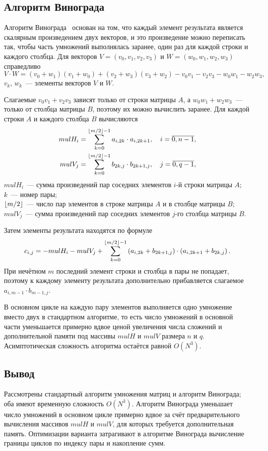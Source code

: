\subsection{Алгоритм Винограда}
Алгоритм Винограда~\cite{winograd1968} основан на том, что каждый элемент результата является скалярным произведением двух векторов, и это произведение можно переписать так, чтобы часть умножений выполнялась заранее, один раз для каждой строки и каждого столбца. Для векторов $V = (v_0, v_1, v_2, v_3)$ и $W = (w_0, w_1, w_2, w_3)$ справедливо
\begin{equation}
	\label{eq:wino-idea}
	V \cdot W = (v_0 + w_1)(v_1 + w_0) + (v_2 + w_3)(v_3 + w_2) - v_0 v_1 - v_2 v_3 - w_0 w_1 - w_2 w_3,
\end{equation}
\where{} $v_k$, $w_k$~--- элементы векторов $V$ и $W$.

Слагаемые $v_0 v_1 + v_2 v_3$ зависят только от строки матрицы $A$, а $w_0 w_1 + w_2 w_3$~--- только от столбца матрицы $B$, поэтому их можно вычислить заранее. Для каждой строки $A$ и каждого столбца $B$ вычисляются
\begin{align}
	\label{eq:mulH}
	mulH_i &= \sum_{k=0}^{\lfloor m/2 \rfloor-1} a_{i,2k} \cdot a_{i,2k+1}, \quad i = \overline{0, n-1}, \\
	\label{eq:mulV}
	mulV_j &= \sum_{k=0}^{\lfloor m/2 \rfloor-1} b_{2k,j} \cdot b_{2k+1,j}, \quad j = \overline{0, q-1},
\end{align}
\where{} $mulH_i$~--- сумма произведений пар соседних элементов $i$-й строки матрицы $A$;\\
$k$~--- номер пары;\\
$\lfloor m/2 \rfloor$~--- число пар элементов в строке матрицы $A$ и в столбце матрицы $B$;\\
$mulV_j$~--- сумма произведений пар соседних элементов $j$-го столбца матрицы $B$.

Затем элементы результата находятся по формуле
\begin{equation}
	\label{eq:wino-c}
	c_{i,j} = -mulH_i - mulV_j + \sum_{k=0}^{\lfloor m/2 \rfloor-1} \left(a_{i,2k} + b_{2k+1,j}\right) \cdot \left(a_{i,2k+1} + b_{2k,j}\right).
\end{equation}
При нечётном $m$ последний элемент строки и столбца в пары не попадает, поэтому к каждому элементу результата дополнительно прибавляется слагаемое $a_{i,m-1} \cdot b_{m-1,j}$.

В основном цикле на каждую пару элементов выполняется одно умножение вместо двух в стандартном алгоритме, то есть число умножений в основной части уменьшается примерно вдвое ценой увеличения числа сложений и дополнительной памяти под массивы $mulH$ и $mulV$ размера $n$ и $q$. Асимптотическая сложность алгоритма остаётся равной $O(N^3)$.

\subsection{Вывод}
Рассмотрены стандартный алгоритм умножения матриц и алгоритм Винограда; оба имеют временную сложность $O(N^3)$. Алгоритм Винограда уменьшает число умножений в основном цикле примерно вдвое за счёт предварительного вычисления массивов $mulH$ и $mulV$, для которых требуется дополнительная память. Оптимизации варианта затрагивают в алгоритме Винограда вычисление границы циклов по индексу пары и накопление сумм.
